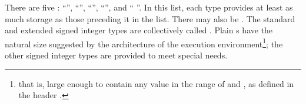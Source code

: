 \pnum
{}%
%
There are five  :
%
%
%
%
%
``'', ``'', ``'',
``'', and ``  ''. In
this list, each type provides at least as much storage as those
preceding it in the list.
%
%
%
%
There may also be  . The standard and
extended signed integer types are collectively called .
%
Plain
s have the natural size suggested by the architecture of the
execution environment\footnote{that is, large enough to contain any value in the range of
 and , as defined in the header
.};
the other signed integer types are provided to meet special needs.

